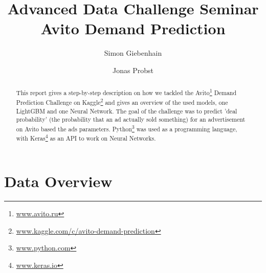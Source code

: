 \documentclass[runningheads]{llncs}
\begin{document}
%
\title{Advanced Data Challenge Seminar\\
		Avito Demand Prediction}
%

%
\author{Simon Giebenhain \and Jonas Probst}
%

%
%
\maketitle              %
%
\begin{abstract}
This report gives a step-by-step description on how we tackled the Avito\footnote{\url{www.avito.ru}} Demand Prediction Challenge on Kaggle\footnote{\url{www.kaggle.com/c/avito-demand-prediction}} and gives an overview of the used models, one LightGBM and one Neural Network. The goal of the challenge was to predict 'deal probability' (the probability that an ad actually sold something) for an advertisement on Avito based the ads parameters. Python\footnote{\url{www.python.com}} was used as a programming language, with Keras\footnote{\url{www.keras.io}} as an API to work on Neural Networks.

\end{abstract}
%
%
%
	\section{Data Overview}
\end{document}
